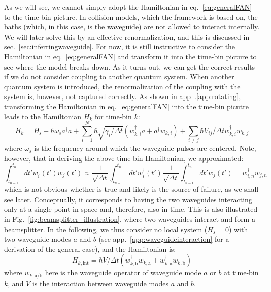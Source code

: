 As we will see, we cannot simply adopt the Hamiltonian in eq.~\eqref{eq:generalFAN} to the time-bin picture. In collision models, which the framework is based on, the baths (which, in this case, is the waveguide) are not allowed to interact internally. We will later solve this by an effective renormalization, and this is discussed in sec.~\ref{sec:inferringwaveguide}. For now, it is still instructive to consider the Hamiltonian in eq.~\eqref{eq:generalFAN} and transform it into the time-bin picture to see where the model breaks down. As it turns out, we can get the correct results if we do not consider coupling to another quantum system. When another quantum system is introduced, the renormalization of the coupling with the system is, however, not captured correctly. As shown in app~.\ref{app:rotating}, transforming the Hamiltonian in eq.~\eqref{eq:generalFAN} into the time-bin picutre leads to the Hamiltonian $H_k$ for time-bin $k$:
\begin{equation}
    H_{k} = H_{\mathrm{s}}- \hbar \omega_s a^\dagger a  + \sum_{i=1}^N \hbar \sqrt{\gamma_i/\Delta t} \left(w_{k,i}^{\dagger} a+a^{\dagger} w_{k,i} \right) + \sum_{i \neq j} \hbar  V_{i j}/\Delta t w_{k,i}^{\dagger} w_{k,j} \label{eq:general_transformed}
\end{equation}
where $\omega_s$ is the frequency around which the waveguide pulses are centered. Note, however, that in deriving the above time-bin Hamiltonian, we approximated:
\begin{equation}
   \int_{t_{n-1}}^{t_n} dt' w_i^\dagger(t') w_j(t') \approx \frac{1}{\sqrt{\Delta t}} \int_{t_{n-1}}^{t_n} d t' w^\dagger_{i}(t') \frac{1}{\sqrt{\Delta t}} \int_{t_{n-1}}^{t_n} d t' w_{j}(t') =  w^\dagger_{i,n} w_{j,n} \label{eq:interaction_ansatz}
\end{equation}
which is not obvious whether is true and likely is the source of failure, as we shall see later. Conceptually, it corresponds to having the two waveguides interacting only at a single point in space and, therefore, also in time. This is also illustrated in Fig.~\ref{fig:beamsplitter_illustration}, where two waveguides interact and form a beamsplitter. In the following, we thus consider no local system ($H_s = 0$) with two waveguide modes $a$ and $b$ (see app.~\ref{app:waveguideinteraction} for a derivation of the general case), and the Hamiltonian is:
\begin{equation}
    H_{k,\mathrm{int}} = \hbar V/\Delta t (w_{k,\mathrm{b}}^\dagger w_{k,\mathrm{a}} + w_{k,\mathrm{a}}^\dagger w_{k,\mathrm{b}})
    \label{eq:waveguideinteraction}
\end{equation}
where $w_{k, \mathrm{a} / \mathrm{b}}$ here is the waveguide operator of waveguide mode $a$ or $b$ at time-bin $k$, and $V$ is the interaction between waveguide modes $a$ and $b$. 

